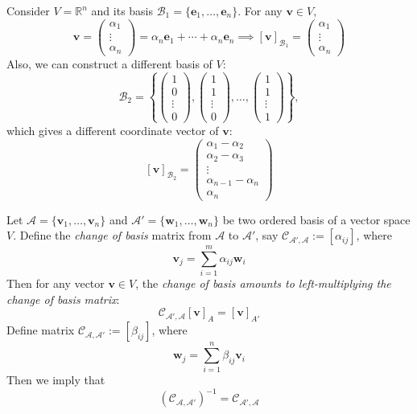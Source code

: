\begin{example}
Consider $V=\mathbb{R}^n$ and its basis $\mathcal{B}_1=\{\bm e_1,\dots,\bm e_n\}$. 
For any $\bm v\in V$,
\[
\bm v=\begin{pmatrix}
\alpha_1\\\vdots\\\alpha_n
\end{pmatrix}=\alpha_n\bm e_1+\cdots+\alpha_n\bm e_n
\implies
[\bm v]_{\mathcal{B}_1}=\begin{pmatrix}
\alpha_1\\\vdots\\\alpha_n
\end{pmatrix}
\]
Also, we can construct a different basis of $V$:
\[
\mathcal{B}_2=
\left\{
\begin{pmatrix}
1\\0\\\vdots\\0
\end{pmatrix},
\begin{pmatrix}
1\\1\\\vdots\\0
\end{pmatrix},
\ldots,
\begin{pmatrix}
1\\1\\\vdots\\1
\end{pmatrix}
\right\},
\]
which gives a different coordinate vector of $\bm v$:
\[
[\bm v]_{\mathcal{B}_2}=
\begin{pmatrix}
\alpha_1-\alpha_2\\
\alpha_2-\alpha_3\\
\vdots\\
\alpha_{n-1}-\alpha_n\\
\alpha_n
\end{pmatrix}
\]
\end{example}

\begin{proposition}
Let $\mathcal{A}=\{\bm v_1,\dots,\bm v_n\}$ and $\mathcal{A}'=\{\bm w_1,\dots,\bm w_n\}$ be two ordered basis of a vector space $V$. Define the \emph{change of basis} matrix from $\mathcal{A}$ to $\mathcal{A}'$, say $\mathcal{C}_{\mathcal{A}',\mathcal{A}}:=[\alpha_{ij}]$, where
\[
\bm v_j=\sum_{i=1}^m\alpha_{ij}\bm w_i
\]
Then for any vector $\bm v\in V$, the \textit{change of basis amounts to left-multiplying the change of basis matrix}:
\begin{equation}\label{Eq:3:1}
\mathcal{C}_{\mathcal{A}',\mathcal{A}}[\bm v]_A=[\bm v]_{A'}
\end{equation}
Define matrix $\mathcal{C}_{\mathcal{A},\mathcal{A}'}:=[\beta_{ij}]$, where 
\[
\bm w_j=\sum_{i=1}^n\beta_{ij}\bm v_i
\]
Then we imply that 
\[
(\mathcal{C}_{\mathcal{A},\mathcal{A}'})^{-1}=\mathcal{C}_{\mathcal{A}',\mathcal{A}}
\]
\end{proposition}

